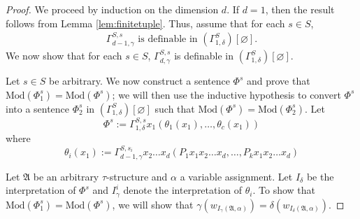 \documentclass[a4paper,UKenglish,cleveref, autoref, thm-restate, anonymous]{lipics-v2021}
\begin{document}
\begin{proof}
    We proceed by induction on the dimension $d$. If $d=1$, then the result follows from Lemma \ref{lem:finitetuple}. Thus, assume that for each $s \in S$,
    \begin{align*}
        \text{$\Gamma^{S,s}_{d-1,\gamma}$ is definable in $(\Gamma^{S}_{1,\delta})[\varnothing]$.}\tag{I.H.}
    \end{align*}
    We now show that for each $s \in S$, $\Gamma^{S,s}_{d,\gamma}$ is definable in $(\Gamma^{S}_{1,\delta})[\varnothing]$.

    \iffalse
    By Lemma \ref{lem:finitetuple}, we know that there is a sentence of the form \[
        \Phi_1' := \Gamma^{S,s}_{d,\delta}\overline{x_l}\langle \psi_1(\overline{x_l}), \dots, \psi_c(\overline{x_l})\rangle,
    \] where each $\psi_i$ is a boolean combination of $P_1,\dots,P_k$, such that $\text{Mod}(\Phi_1) = \text{Mod}(\Phi_1')$.
    \fi

    Let $s \in S$ be arbitrary. We now construct a sentence $\Phi^s$ and prove that $\text{Mod}(\Phi_1^s) = \text{Mod}(\Phi^s)$; we will then use the inductive hypothesis to convert $\Phi^s$ into a sentence $\Phi_2^s$ in $(\Gamma^S_{1,\delta})[\varnothing]$ such that $\text{Mod}(\Phi^s) = \text{Mod}(\Phi_2^s)$. Let \[
        \Phi^s := \Gamma^{S,s}_{1,\delta}x_1( \theta_1(x_1), \dots, \theta_c(x_1))
    \] where \[
        \theta_i (x_1) := \Gamma^{S,s_i}_{d-1,\gamma}x_2\dots x_d( P_1 x_1x_2\dots x_d, \dots, P_k x_1x_2\dots x_d)
    \]

    Let $\mathfrak{A}$ be an arbitrary $\tau$-structure and $\alpha$ a variable assignment. Let $I_\delta$ be the interpretation of $\Phi^s$ and $I^i_\gamma$ denote the interpretation of $\theta_i$. To show that $\text{Mod}(\Phi^s_1) = \text{Mod}(\Phi^s)$, we will show that $\gamma(w_{I_\gamma(\mathfrak{A},\alpha)}) = \delta(w_{I_\delta(\mathfrak{A},\alpha)})$.
    

\end{proof}
\end{document}

